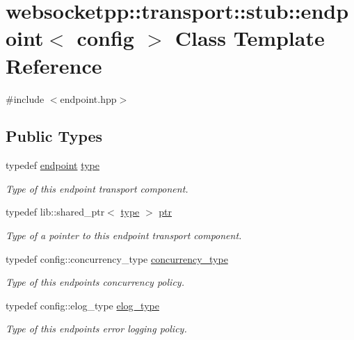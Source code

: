 \hypertarget{classwebsocketpp_1_1transport_1_1stub_1_1endpoint}{}\section{websocketpp\+:\+:transport\+:\+:stub\+:\+:endpoint$<$ config $>$ Class Template Reference}
\label{classwebsocketpp_1_1transport_1_1stub_1_1endpoint}


{\ttfamily \#include $<$endpoint.\+hpp$>$}

\subsection*{Public Types}
\begin{DoxyCompactItemize}
\item 
typedef \hyperlink{classwebsocketpp_1_1transport_1_1stub_1_1endpoint}{endpoint} \hyperlink{classwebsocketpp_1_1transport_1_1stub_1_1endpoint_af621f6f1f67f9e3eea1e0d28eb5f60ae}{type}
\begin{DoxyCompactList}\small\item\em Type of this endpoint transport component. \end{DoxyCompactList}\item 
typedef lib\+::shared\+\_\+ptr$<$ \hyperlink{classwebsocketpp_1_1transport_1_1stub_1_1endpoint_af621f6f1f67f9e3eea1e0d28eb5f60ae}{type} $>$ \hyperlink{classwebsocketpp_1_1transport_1_1stub_1_1endpoint_a00a3092b0664dac9cff00785f2b96e88}{ptr}
\begin{DoxyCompactList}\small\item\em Type of a pointer to this endpoint transport component. \end{DoxyCompactList}\item 
typedef config\+::concurrency\+\_\+type \hyperlink{classwebsocketpp_1_1transport_1_1stub_1_1endpoint_a1d70a45c1abdc4c84867a94511da067e}{concurrency\+\_\+type}
\begin{DoxyCompactList}\small\item\em Type of this endpoint\textquotesingle{}s concurrency policy. \end{DoxyCompactList}\item 
typedef config\+::elog\+\_\+type \hyperlink{classwebsocketpp_1_1transport_1_1stub_1_1endpoint_a7890584ddff40571589f62c52bc5b080}{elog\+\_\+type}
\begin{DoxyCompactList}\small\item\em Type of this endpoint\textquotesingle{}s error logging policy. \end{DoxyCompactList}\item 

\end{DoxyCompactItemize}
